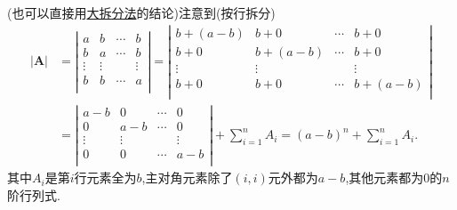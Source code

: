 \documentclass[../../main.tex]{subfiles}
\begin{document}
\begin{solution}
{\color{blue}}
(也可以直接用\hyperref[大拆分法]{大拆分法}的结论)注意到(按行拆分)
\begin{align*}
|\boldsymbol{A}|&=\left| \begin{matrix}
a&		b&		\cdots&		b\\
b&		a&		\cdots&		b\\
\vdots&		\vdots&		&		\vdots\\
b&		b&		\cdots&		a\\
\end{matrix} \right|=\left| \begin{matrix}
b+\left( a-b \right)&		b+0&		\cdots&		b+0\\
b+0&		b+\left( a-b \right)&		\cdots&		b+0\\
\vdots&		\vdots&		&		\vdots\\
b+0&		b+0&		\cdots&		b+\left( a-b \right)\\
\end{matrix} \right|
\\
&=\left| \begin{matrix}
a-b&		0&		\cdots&		0\\
0&		a-b&		\cdots&		0\\
\vdots&		\vdots&		&		\vdots\\
0&		0&		\cdots&		a-b\\
\end{matrix} \right|+\sum_{i=1}^n{A_i}=\left( a-b \right) ^n+\sum_{i=1}^n{A_i}.
\end{align*}
其中$A_i$是第$i$行元素全为$b$,主对角元素除了$( i,i )$元外都为$a-b$,其他元素都为0的$n$阶行列式.


\end{solution}
\end{document}
